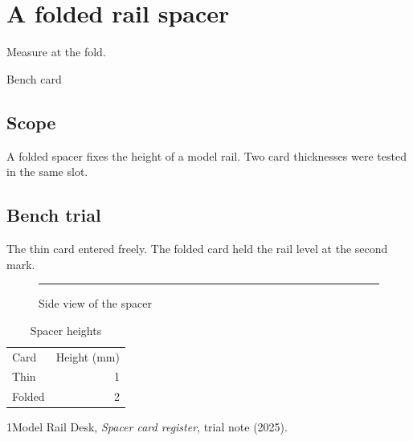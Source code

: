 \documentclass[oneside,openany]{memoir}
\begin{document}
\chapter{A folded rail spacer}\epigraph{Measure at the fold.}{Bench card}\section*{Scope}A folded spacer fixes the height of a model rail. Two card thicknesses were tested in the same slot.
\section{Bench trial}
The thin card entered freely. The folded card held the rail level at the second mark.
\begin{figure}[ht]\centering\rule{28mm}{2mm}\caption{Side view of the spacer}\end{figure}
\begin{table}[ht]\centering\begin{tabular}{lr}Card&Height (mm)\\Thin&1\\Folded&2\end{tabular}\caption{Spacer heights}\end{table}
\begin{thebibliography}{1}Model Rail Desk, \emph{Spacer card register}, trial note (2025).\end{thebibliography}
\end{document}
